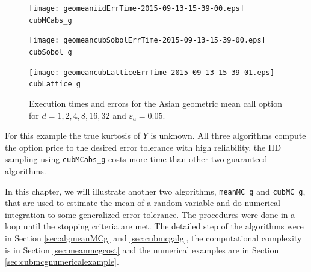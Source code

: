 \documentclass{iitthesis}
\begin{document}
\begin{figure}
\centering
\begin{minipage}{9cm} \centering \texttt{[image: geomeaniidErrTime-2015-09-13-15-39-00.eps]} \\ {\tt cubMCabs\_g} \end{minipage}
\begin{minipage}{7cm} \centering \texttt{[image: geomeancubSobolErrTime-2015-09-13-15-39-00.eps]} \\ {\tt cubSobol\_g} \end{minipage}
\begin{minipage}{7cm} \centering \texttt{[image: geomeancubLatticeErrTime-2015-09-13-15-39-01.eps]} \\ {\tt cubLattice\_g} \end{minipage}
\caption{Execution times and errors for the Asian geometric mean call option for $d=1, 2, 4, 8, 16, 32$ and $\varepsilon_a=0.05$.\label{fig:GeoMeanAsianOptionabstol}}
\end{figure}

For this example the true kurtosis of $Y$ is unknown.  
All three algorithms compute the option price to the desired error tolerance with high reliability.  the IID sampling using {\tt cubMCabs\_g} costs more time than other two guaranteed algorithms.


\label{chapter:meanMCg}
In this chapter, we will illustrate another two algorithms, {\tt meanMC\_g} and {\tt cubMC\_g}, that are used to estimate the mean of a random variable and do numerical integration to some generalized error tolerance. The procedures were done in a loop until the stopping criteria are met. The detailed step of the algorithms were in Section \ref{sec:algmeanMCg} and \ref{sec:cubmcgalg}, the computational complexity is in Section \ref{sec:meanmcgcost} and the numerical examples are in Section \ref{sec:cubmcgnumericalexample}.
\end{document}
